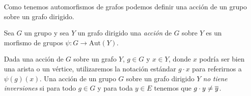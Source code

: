 \documentclass[tesis.tex]{subfiles}
\begin{document}
\begin{leoenv}
Como tenemos automorfismos de grafos podemos definir una acción de un grupo sobre un grafo dirigido.
\begin{deff}
	Sea $G$ un grupo y sea $Y$ un grafo dirigido una \emph{acción} de $G$ sobre $Y$ es un morfismo de grupos $\psi: G \to \text{Aut}(Y)$.
	
\end{deff}

Dada una acción de $G$ sobre un grafo $Y$, $g \in G$ y $x \in Y$, donde $x$ podría ser bien una arista o un vértice, utilizaremos la notación estándar $g \cdot x$ para referirnos a $\psi(g)(x)$.
Una acción de un grupo $G$ sobre un grafo dirigido $Y$ \emph{no tiene inversiones} si para todo $g \in G$ y para toda $y \in E$ tenemos que $g \cdot y \neq \overline y$.



\end{leoenv}
\end{document}
